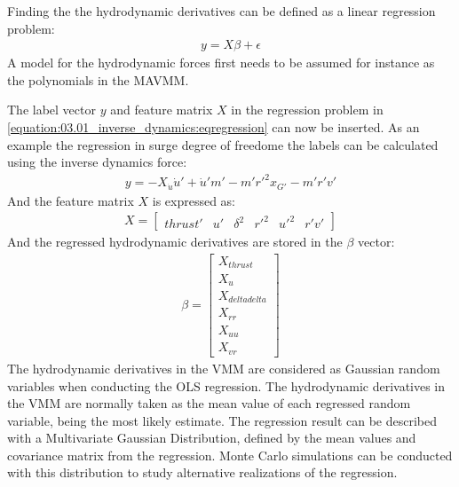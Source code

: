 \documentclass[review]{elsarticle}
\begin{document}
\sphinxAtStartPar
Finding the the hydrodynamic derivatives can be defined as a linear regression problem:
\begin{equation}\label{equation:03.01_inverse_dynamics:eqregression}
\begin{split}y = X\beta + \epsilon\end{split}
\end{equation}
\sphinxAtStartPar
A model for the hydrodynamic forces first needs to be assumed for instance as the polynomials in the MAVMM.

\sphinxAtStartPar
The label vector \(y\) and feature matrix \(X\) in the regression problem in \autoref{equation:03.01_inverse_dynamics:eqregression} can now be inserted. As an example the regression in surge degree of freedome the labels can be calculated using the inverse dynamics force:
\begin{equation}\label{equation:03.01_inverse_dynamics:diff_eq_X_y}
\begin{split}\displaystyle y = - X_{\dot{u}} \dot{u}' + \dot{u}' m' - m' r'^{2} x_{G'} - m' r' v'\end{split}
\end{equation}
\sphinxAtStartPar
And the feature matrix \(X\) is expressed as:
\begin{equation}\label{equation:03.01_inverse_dynamics:diff_eq_X_X}
\begin{split}\displaystyle X = \left[\begin{matrix}thrust' & u' & \delta^{2} & r'^{2} & u'^{2} & r' v'\end{matrix}\right]\end{split}
\end{equation}
\sphinxAtStartPar
And the regressed hydrodynamic derivatives are stored in the \(\beta\) vector:
\begin{equation}\label{equation:03.01_inverse_dynamics:diff_eq_X_beta}
\begin{split}\displaystyle \beta = \left[\begin{matrix}X_{thrust}\\X_{u}\\X_{deltadelta}\\X_{rr}\\X_{uu}\\X_{vr}\end{matrix}\right]\end{split}
\end{equation}
\sphinxAtStartPar
The hydrodynamic derivatives in the VMM are considered as Gaussian random variables when conducting the OLS regression. The hydrodynamic derivatives in the VMM are normally taken as the mean value of each regressed random variable, being the most likely estimate. The regression result can be described with a Multivariate Gaussian Distribution, defined by the mean values and covariance matrix from the regression. Monte Carlo simulations can be conducted with this distribution to study alternative realizations of the regression.
\end{document}

